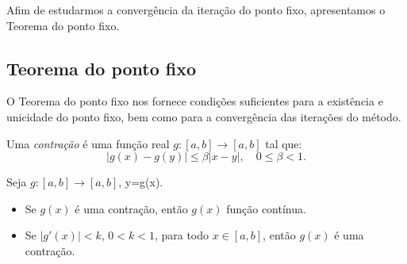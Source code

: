 




Afim de estudarmos a convergência da iteração do ponto fixo, apresentamos o Teorema do ponto fixo.

\subsection{Teorema do ponto fixo}

O Teorema do ponto fixo nos fornece condições suficientes para a existência e unicidade do ponto fixo, bem como para a convergência das iterações do método.

\begin{defn}
 Uma \emph{contração} é uma função real $g:[a, b]\to [a, b]$ tal que:
 \begin{equation*}
   |g(x)-g(y)|\leq \beta |x-y|,\quad 0\leq \beta < 1.
 \end{equation*}
\end{defn}

\begin{obs}Seja $g:[a, b]\to [a, b]$, y=g(x).
  \begin{itemize}
  \item Se $g(x)$ é uma contração, então $g(x)$ função contínua.
  \item Se $|g'(x)| < k$, $0 < k < 1$, para todo $x\in [a, b]$, então $g(x)$ é uma contração.
  \end{itemize}
\end{obs}

